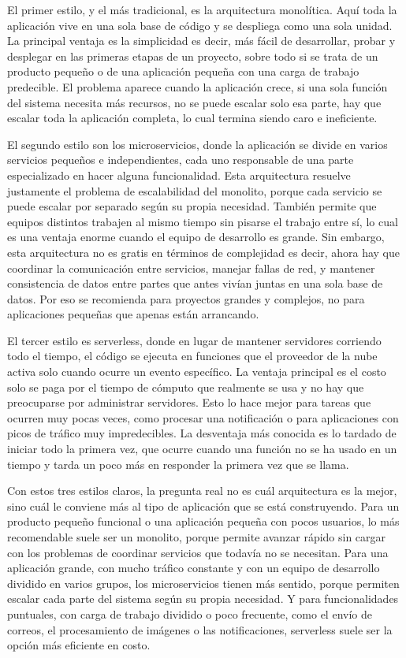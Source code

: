 \documentclass[12pt,letterpaper]{article}
\begin{document}
El primer estilo, y el más tradicional, es la arquitectura monolítica. Aquí toda la aplicación vive en una sola base de código y se despliega como una sola unidad. La principal ventaja es la simplicidad es decir, más fácil de desarrollar, probar y desplegar en las primeras etapas de un proyecto, sobre todo si se trata de un producto pequeño o de una aplicación pequeña con una carga de trabajo predecible. El problema aparece cuando la aplicación crece, si una sola función del sistema necesita más recursos, no se puede escalar solo esa parte, hay que escalar toda la aplicación completa, lo cual termina siendo caro e ineficiente.

El segundo estilo son los microservicios, donde la aplicación se divide en varios servicios pequeños e independientes, cada uno responsable de una parte especializado en hacer alguna funcionalidad. Esta arquitectura resuelve justamente el problema de escalabilidad del monolito, porque cada servicio se puede escalar por separado según su propia necesidad. También permite que equipos distintos trabajen al mismo tiempo sin pisarse el trabajo entre sí, lo cual es una ventaja enorme cuando el equipo de desarrollo es grande. Sin embargo, esta arquitectura no es gratis en términos de complejidad es decir, ahora hay que coordinar la comunicación entre servicios, manejar fallas de red, y mantener consistencia de datos entre partes que antes vivían juntas en una sola base de datos. Por eso se recomienda para proyectos grandes y complejos, no para aplicaciones pequeñas que apenas están arrancando.

El tercer estilo es serverless, donde en lugar de mantener servidores corriendo todo el tiempo, el código se ejecuta en funciones que el proveedor de la nube activa solo cuando ocurre un evento específico. La ventaja principal es el costo solo se paga por el tiempo de cómputo que realmente se usa y no hay que preocuparse por administrar servidores. Esto lo hace mejor para tareas que ocurren muy pocas veces, como procesar una notificación o para aplicaciones con picos de tráfico muy impredecibles. La desventaja más conocida es lo tardado de iniciar todo la primera vez, que ocurre cuando una función no se ha usado en un tiempo y tarda un poco más en responder la primera vez que se llama.

Con estos tres estilos claros, la pregunta real no es cuál arquitectura es la mejor, sino cuál le conviene más al tipo de aplicación que se está construyendo. Para un producto pequeño funcional o una aplicación pequeña con pocos usuarios, lo más recomendable suele ser un monolito, porque permite avanzar rápido sin cargar con los problemas de coordinar servicios que todavía no se necesitan. Para una aplicación grande, con mucho tráfico constante y con un equipo de desarrollo dividido en varios grupos, los microservicios tienen más sentido, porque permiten escalar cada parte del sistema según su propia necesidad. Y para funcionalidades puntuales, con carga de trabajo dividido o poco frecuente, como el envío de correos, el procesamiento de imágenes o las notificaciones, serverless suele ser la opción más eficiente en costo.
\end{document}
